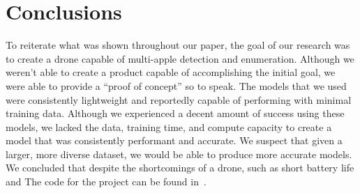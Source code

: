 \section{Conclusions}
To reiterate what was shown throughout our paper, the goal of our research was to create a drone capable of multi-apple detection and enumeration.
Although we weren't able to create a product capable of accomplishing the initial goal, we were able to provide a ``proof of concept'' so to speak.
The models that we used were consistently lightweight and reportedly capable of performing with minimal training data. 
Although we experienced a decent amount of success using these models, we lacked the data, training time, and compute capacity to create a model that was consistently performant and accurate.
We suspect that given a larger, more diverse dataset, we would be able to produce more accurate models. 
We concluded that despite the shortcomings of a drone, such as short battery life and 
The code for the project can be found in~\cite{FruitFly}.

